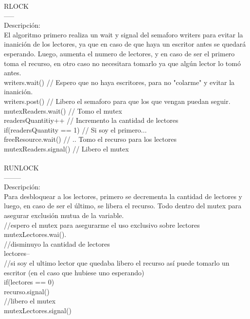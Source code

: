 RLOCK\\
-----\\
Descripción:\\
El algoritmo primero realiza un wait y signal del semaforo writers para evitar la inanición de los lectores, ya que en caso de que haya un escritor antes se quedará esperando.
Luego, aumenta el numero de lectores, y en caso de ser el primero toma el recurso, en otro caso no necesitara tomarlo ya que algún lector lo tomó antes. \\

	writers.wait()			// Espero que no haya escritores, para no "colarme" y evitar la inanición.\\
	writers.post()			// Libero el semaforo para que los que vengan puedan seguir.\\
	mutexReaders.wait()		// Tomo el mutex\\
	readersQuantitiy++		// Incremento la cantidad de lectores\\
	if(readersQuantity == 1)	// Si soy el primero... \\
		freeResource.wait()	// .. Tomo el recurso para los lectores\\
	mutexReaders.signal()		// Libero el mutex\\
\\
RUNLOCK\\
--------\\
Descripción:\\
Para desbloquear a los lectores, primero se decrementa la cantidad de lectores y luego, en caso de ser el último, se libera el recurso. Todo dentro del mutex para asegurar exclusión mutua de la variable.\\
//espero el mutex para asegurarme el uso exclusivo sobre lectores\\
mutexLectores.wai().\\
//disminuyo la cantidad de lectores\\
lectores--\\
//si soy el ultimo lector que quedaba libero el recurso así puede tomarlo un escritor (en el caso que hubiese uno esperando)\\
if(lectores == 0)\\
	recurso.signal()\\
//libero el mutex\\
mutexLectores.signal()\\
